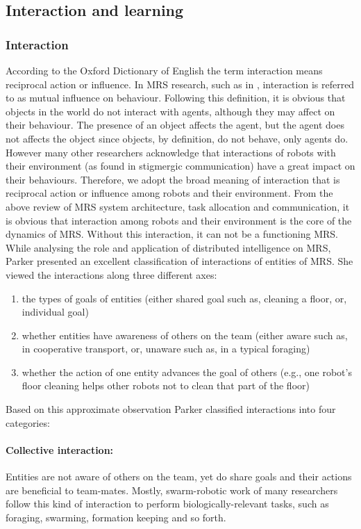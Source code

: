 \subsection{Interaction and learning}
\label{bg:mrs:learn}
\subsubsection*{Interaction}
According to the Oxford Dictionary of English the term interaction means reciprocal action or influence. In MRS research, such as in \cite{Mataric1994}, interaction is referred to as mutual influence on behaviour. Following this definition, it is obvious that objects in the world do not interact with agents, although they may affect on their behaviour. The presence of an object affects the agent, but the agent does not affects the object since objects, by definition, do not behave, only agents do. However many other researchers acknowledge that interactions of robots with their environment (as found in stigmergic communication) have a great impact on their behaviours. Therefore, we adopt the broad meaning of interaction that is reciprocal action or influence among robots and their environment.
From the above review of MRS system architecture, task allocation and communication, it is obvious that interaction among robots and their environment is the core of the dynamics of MRS.
Without this interaction, it can not be a functioning MRS. 
While analysing the role and application of distributed intelligence on MRS, Parker \cite{Parker2008} presented an excellent classification of interactions of entities of MRS. She viewed the interactions along three different axes:
\begin{enumerate}
\item the types of goals of entities (either shared goal such as, cleaning a floor, or, individual goal)
\item whether entities have awareness of others on the team (either aware such as, in cooperative transport, or, unaware such as, in a typical foraging)
\item whether the action of one entity advances the goal of others (e.g., one robot's floor cleaning helps other robots not to clean that part of the floor)
\end{enumerate}
Based on this approximate observation Parker classified interactions into four categories:
\paragraph{Collective interaction:}
Entities are not aware of others on the team, yet do share goals and their actions are beneficial to team-mates. Mostly, swarm-robotic work of many researchers follow this kind of interaction to perform biologically-relevant tasks, such as foraging, swarming, formation keeping and so forth.
